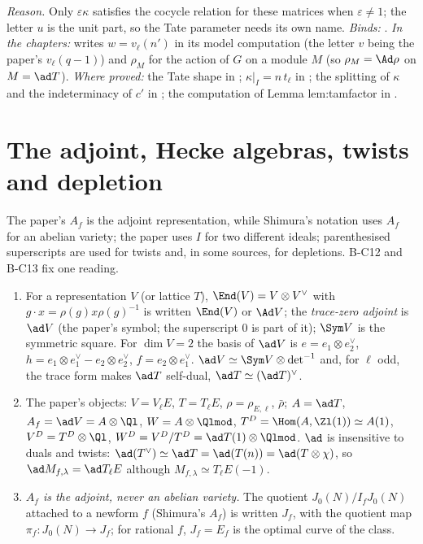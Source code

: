 \noindent\emph{Reason.} Only $\varepsilon\kappa$ satisfies the cocycle relation for these matrices when $\varepsilon\ne1$; the letter $u$ is
the unit part, so the Tate parameter needs its own name. \emph{Binds:}
. \emph{In the
chapters:}  writes $w=v_\ell(n')$ in its model computation (the letter $v$ being the paper's $v_\ell(q-1)$)
and $\rho_M$ for the action of $G$ on a module $M$ (so $\rho_M=\Ad\rho$ on $M=\ad T$). \emph{Where proved:} the Tate shape in
; $\kappa|_{I}=n\,t_\ell$ in ; the splitting of $\kappa$ and the indeterminacy of $c'$ in
; the computation of Lemma lem:tamfactor in .

\section{The adjoint, Hecke algebras, twists and depletion}\label{sec:notation:hecke}

The paper's $A_f$ is the adjoint representation, while Shimura's notation uses $A_f$ for an abelian variety; the paper uses $I$
for two different ideals; parenthesised superscripts are used for twists and, in some sources, for depletions. B-C12 and
B-C13 fix one reading.

\begin{convention}\label{conv:notation:bc12}
\leavevmode
\begin{enumerate}[label=(\alph*)]
\item For a representation $V$ (or lattice $T$), $\End(V)=V\otimes V^\vee$ with $g\cdot x=\rho(g)x\rho(g)^{-1}$ is written $\End(V)$ or
$\Ad V$; the \emph{trace-zero adjoint} is $\ad V$ (the paper's symbol; the superscript $0$ is part of it); $\Sym V$ is the symmetric
square. For $\dim V=2$ the basis of $\ad V$ is $e=e_1\otimes e_2^\vee$, $h=e_1\otimes e_1^\vee-e_2\otimes e_2^\vee$, $f=e_2\otimes e_1^\vee$.
$\ad V\simeq\Sym V\otimes\det^{-1}$ and, for $\ell$ odd, the trace form makes $\ad T$ self-dual, $\ad T\simeq(\ad T)^\vee$.
\item The paper's objects: $V=V_\ell E$, $T=T_\ell E$, $\rho=\rho_{E,\ell}$, $\bar\rho$; $A=\ad T$, $A_f=\ad V=A\otimes\Ql$, $W=A\otimes\Qlmod$,
$T^D=\Hom(A,\Zl(1))\simeq A(1)$, $V^D=T^D\otimes\Ql$, $W^D=V^D/T^D=\ad T(1)\otimes\Qlmod$. $\ad$ is insensitive to duals and twists:
$\ad(T^\vee)\simeq\ad T=\ad(T(n))=\ad(T\otimes\chi)$, so $\ad M_{f,\lambda}=\ad T_\ell E$ although $M_{f,\lambda}\simeq T_\ell E(-1)$.
\item \emph{$A_f$ is the adjoint, never an abelian variety.} The quotient $J_0(N)/I_fJ_0(N)$ attached to a newform $f$ (Shimura's
$A_f$) is written $J_f$, with the quotient map $\pi_f\colon J_0(N)\to J_f$; for rational $f$, $J_f=E_f$ is the optimal curve of the class.
\end{enumerate}
\end{convention}

